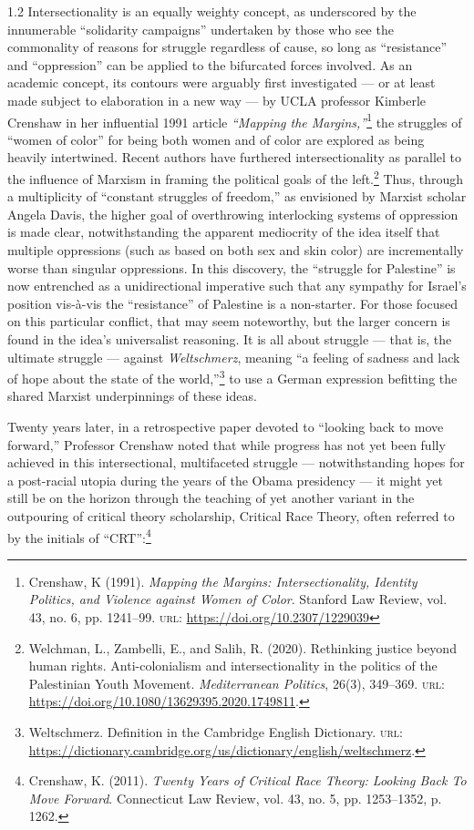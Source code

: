 \documentclass[../unravbook.tex]{subfiles}
\begin{document}
\begin{spacing}{1.2}
Intersectionality is an equally weighty concept, as underscored by the innumerable ``solidarity campaigns'' undertaken by those who see the commonality of reasons for struggle regardless of cause, so long as ``resistance'' and ``oppression'' can be applied to the bifurcated forces involved. As an academic concept, its contours were arguably first investigated --- or at least made subject to elaboration in a new way --- by UCLA professor Kimberle Crenshaw in her influential 1991 article \textit{``Mapping the Margins,''}\footnote{Crenshaw, K (1991). \textit{Mapping the Margins: Intersectionality, Identity Politics, and Violence against Women of Color}. Stanford Law Review, vol. 43, no. 6, pp. 1241--99. \textsc{url: } \url{https://doi.org/10.2307/1229039}} the struggles of ``women of color'' for being both women and of color are explored as being heavily intertwined. Recent authors have furthered intersectionality as parallel to the influence of Marxism in framing the political goals of the left.\footnote{Welchman, L., Zambelli, E., and Salih, R. (2020). Rethinking justice beyond human rights. Anti-colonialism and intersectionality in the politics of the Palestinian Youth Movement. \textit{Mediterranean Politics}, 26(3), 349--369. \textsc{url: } \url{https://doi.org/10.1080/13629395.2020.1749811}.} Thus, through a multiplicity of ``constant struggles of freedom,'' as envisioned by Marxist scholar Angela Davis, the higher goal of overthrowing interlocking systems of oppression is made clear, notwithstanding the apparent mediocrity of the idea itself that multiple oppressions (such as based on both sex and skin color) are incrementally worse than singular oppressions. In this discovery, the ``struggle for Palestine'' is now entrenched as a unidirectional imperative such that any sympathy for Israel's position vis-à-vis the ``resistance'' of Palestine is a non-starter. For those focused on this particular conflict, that may seem noteworthy, but the larger concern is found in the idea's universalist reasoning. It is all about struggle --- that is, the ultimate struggle --- against \textit{Weltschmerz}, meaning ``a feeling of sadness and lack of hope about the state of the world,''\footnote{Weltschmerz. Definition in the Cambridge English Dictionary. \textsc{url: } \url{ https://dictionary.cambridge.org/us/dictionary/english/weltschmerz}.} to use a German expression befitting the shared Marxist underpinnings of these ideas. 

Twenty years later, in a retrospective paper devoted to ``looking back to move forward,'' Professor Crenshaw noted that while progress has not yet been fully achieved in this intersectional, multifaceted struggle --- notwithstanding hopes for a post-racial utopia during the years of the Obama presidency --- it might yet still be on the horizon through the teaching of yet another variant in the outpouring of critical theory scholarship, Critical Race Theory, often referred to by the initials of ``CRT'':\footnote{Crenshaw, K. (2011). \textit{Twenty Years of Critical Race Theory: Looking Back To Move Forward}. Connecticut Law Review, vol. 43, no. 5, pp. 1253--1352, p. 1262.} 


\end{spacing}
\end{document}
